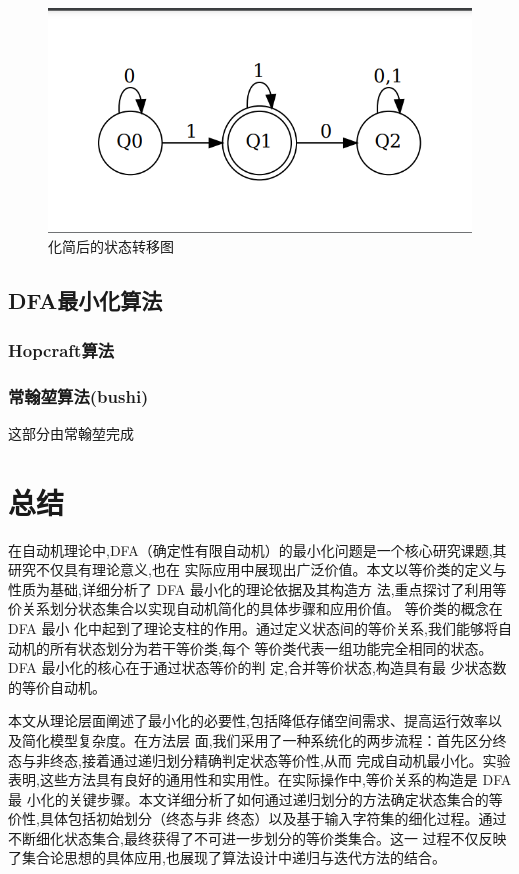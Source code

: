 \documentclass{article}
\begin{document}
\begin{figure}[h]
    \centering
    \includegraphics[scale=0.2]{../Img/minimized_dfa_example.png}
    \caption{化简后的状态转移图}
\end{figure}




\subsection{DFA最小化算法}
\subsubsection{Hopcraft算法}

\subsubsection{常翰堃算法(bushi)}
    这部分由常翰堃完成


\newpage
\section{总结}

在自动机理论中,DFA（确定性有限自动机）的最小化问题是一个核心研究课题,其研究不仅具有理论意义,也在
实际应用中展现出广泛价值。本文以等价类的定义与性质为基础,详细分析了 DFA 最小化的理论依据及其构造方
法,重点探讨了利用等价关系划分状态集合以实现自动机简化的具体步骤和应用价值。 等价类的概念在 DFA 最小
化中起到了理论支柱的作用。通过定义状态间的等价关系,我们能够将自动机的所有状态划分为若干等价类,每个
等价类代表一组功能完全相同的状态。DFA 最小化的核心在于通过状态等价的判 定,合并等价状态,构造具有最
少状态数的等价自动机。
   
   本文从理论层面阐述了最小化的必要性,包括降低存储空间需求、提高运行效率以及简化模型复杂度。在方法层
   面,我们采用了一种系统化的两步流程：首先区分终态与非终态,接着通过递归划分精确判定状态等价性,从而
   完成自动机最小化。实验表明,这些方法具有良好的通用性和实用性。在实际操作中,等价关系的构造是 DFA 最
   小化的关键步骤。本文详细分析了如何通过递归划分的方法确定状态集合的等价性,具体包括初始划分（终态与非
   终态）以及基于输入字符集的细化过程。通过不断细化状态集合,最终获得了不可进一步划分的等价类集合。这一
   过程不仅反映了集合论思想的具体应用,也展现了算法设计中递归与迭代方法的结合。
\end{document}
